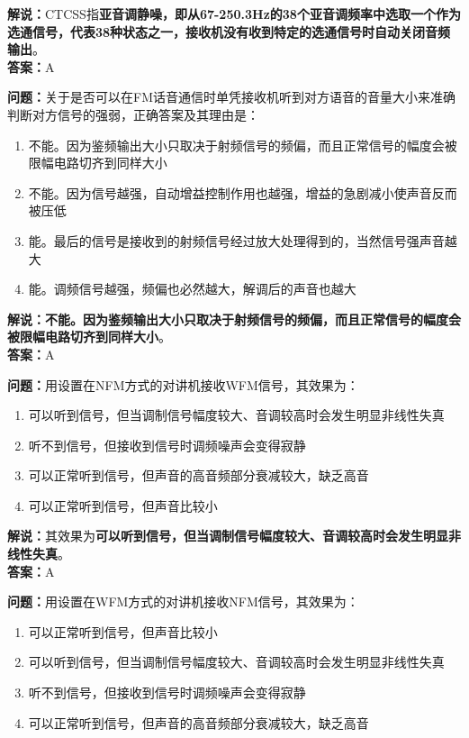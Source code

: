 \textbf{解说：}CTCSS指\textbf{亚音调静噪，即从67-250.3Hz的38个亚音调频率中选取一个作为选通信号，代表38种状态之一，接收机没有收到特定的选通信号时自动关闭音频输出}。\\\textbf{答案：}A%



\textbf{问题：}关于是否可以在FM话音通信时单凭接收机听到对方语音的音量大小来准确判断对方信号的强弱，正确答案及其理由是：

\begin{enumerate}[label=\Alph*), leftmargin=1cm]
	\item 不能。因为鉴频输出大小只取决于射频信号的频偏，而且正常信号的幅度会被限幅电路切齐到同样大小
	\item 不能。因为信号越强，自动增益控制作用也越强，增益的急剧减小使声音反而被压低
	\item 能。最后的信号是接收到的射频信号经过放大处理得到的，当然信号强声音越大
	\item 能。调频信号越强，频偏也必然越大，解调后的声音也越大
\end{enumerate}

\textbf{解说：不能。因为鉴频输出大小只取决于射频信号的频偏，而且正常信号的幅度会被限幅电路切齐到同样大小}。\\\textbf{答案：}A%



\textbf{问题：}用设置在NFM方式的对讲机接收WFM信号，其效果为：

\begin{enumerate}[label=\Alph*), leftmargin=1cm]
	\item 可以听到信号，但当调制信号幅度较大、音调较高时会发生明显非线性失真
	\item 听不到信号，但接收到信号时调频噪声会变得寂静
	\item 可以正常听到信号，但声音的高音频部分衰减较大，缺乏高音
	\item 可以正常听到信号，但声音比较小
\end{enumerate}

\textbf{解说：}其效果为\textbf{可以听到信号，但当调制信号幅度较大、音调较高时会发生明显非线性失真}。\\\textbf{答案：}A%

\textbf{问题：}用设置在WFM方式的对讲机接收NFM信号，其效果为：

\begin{enumerate}[label=\Alph*), leftmargin=1cm]
	\item 可以正常听到信号，但声音比较小
	\item 可以听到信号，但当调制信号幅度较大、音调较高时会发生明显非线性失真
	\item 听不到信号，但接收到信号时调频噪声会变得寂静
	\item 可以正常听到信号，但声音的高音频部分衰减较大，缺乏高音
\end{enumerate}

